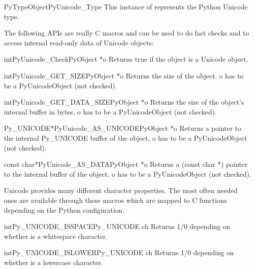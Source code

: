 \documentclass{manual}
\begin{document}
\begin{cvardesc}{PyTypeObject}{PyUnicode_Type}
This instance of  represents the Python Unicode type.
\end{cvardesc}


The following APIs are really C macros and can be used to do fast
checks and to access internal read-only data of Unicode objects:

\begin{cfuncdesc}{int}{PyUnicode_Check}{PyObject *o}
Returns true if the object  is a Unicode object.
\end{cfuncdesc}

\begin{cfuncdesc}{int}{PyUnicode_GET_SIZE}{PyObject *o}
Returns the size of the object.  o has to be a
PyUnicodeObject (not checked).
\end{cfuncdesc}

\begin{cfuncdesc}{int}{PyUnicode_GET_DATA_SIZE}{PyObject *o}
Returns the size of the object's internal buffer in bytes. o has to be
a PyUnicodeObject (not checked).
\end{cfuncdesc}

\begin{cfuncdesc}{Py_UNICODE*}{PyUnicode_AS_UNICODE}{PyObject *o}
Returns a pointer to the internal Py_UNICODE buffer of the object. o
has to be a PyUnicodeObject (not checked).
\end{cfuncdesc}

\begin{cfuncdesc}{const char*}{PyUnicode_AS_DATA}{PyObject *o}
Returns a (const char *) pointer to the internal buffer of the object.
o has to be a PyUnicodeObject (not checked).
\end{cfuncdesc}


Unicode provides many different character properties. The most often
needed ones are available through these macros which are mapped to C
functions depending on the Python configuration.

\begin{cfuncdesc}{int}{Py_UNICODE_ISSPACE}{Py_UNICODE ch}
Returns 1/0 depending on whether  is a whitespace character.
\end{cfuncdesc}

\begin{cfuncdesc}{int}{Py_UNICODE_ISLOWER}{Py_UNICODE ch}
Returns 1/0 depending on whether  is a lowercase character.
\end{cfuncdesc}
\end{document}
